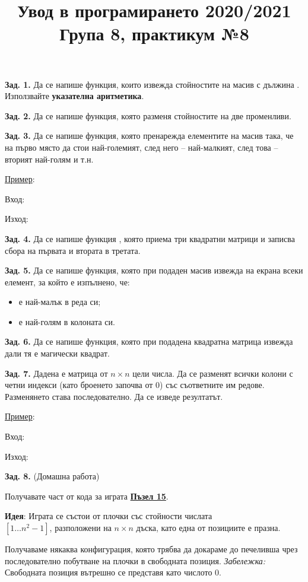 \documentclass[12pt]{article}
\title{Увод в програмирането 2020/2021\\ Група 8, практикум №8}
\date{}
\newcommand{\example}[2] {

    \smallskip
    \underline{Пример}:

    Вход:\hphantom{д} \code{#1}

    Изход: \code{#2}
}
\newcommand{\outputline}[1] {\\\indent \indent #1}
\newcommand{\exercise}[2] {
    \textbf{Зад. #1.} #2
}
\newcommand{\code}[1]{\ltexttt{#1}}
\begin{document}
\maketitle

\exercise{1}{Да се напише функция, които извежда стойностите на масив с дължина \code{n}.
Използвайте \textbf{указателна аритметика}.}
\bigskip

\exercise{2}{Да се напише функция, която разменя стойностите на две променливи.}
\bigskip

\exercise{3}{Да се напише функция, която пренарежда елементите на масив така, че на първо място
да стои най-големият, след него – най-малкият, след това – вторият най-голям и т.н.}
\example{[5, 2, 1, 6, 7, 4]}{[7, 1, 6, 2, 5, 4]}
\bigskip

\exercise{4}{Да се напише функция \code{add}, която приема три квадратни матрици и записва
сбора на първата и втората в третата.}
\bigskip

\exercise{5}{Да се напише функция, която при подаден масив извежда на екрана всеки елемент,
за който е изпълнено, че:
    \begin{itemize}
        \item е най-малък в реда си;
        \item е най-голям в колоната си.
    \end{itemize}
}
\bigskip

\exercise{6}{Да се напише функция, която при подадена квадратна матрица извежда дали
тя е магически квадрат.
}
\bigskip

\newpage

\exercise{7}{Дадена е матрица от $n \times n$ цели числа.
Да се разменят всички колони с четни индекси (като броенето започва от 0) със съответните им редове.
Разменянето става последователно. Да се изведе резултатът.
}
\example{
    \outputline{1 2 3}
    \outputline{4 5 6}
    \outputline{7 8 9}
}{
    \outputline{1 4 3}
    \outputline{2 5 8}
    \outputline{7 6 9}
}
\bigskip

\exercise{8}{(Домашна работа)

Получавате част от кода за играта \href{https://en.wikipedia.org/wiki/15_puzzle}{\textbf{Пъзел 15}}.}

\textbf{Идея}: Играта се състои от плочки със стойности числата\\
$[1 \ldots n^2 - 1]$, разположени на $n \times n$ дъска, като една от позициите е празна.

Получаваме някаква конфигурация, която трябва да докараме до печеливша чрез последователно
побутване на плочки в свободната позиция.
\textit{Забележка:} Свободната позиция вътрешно се представя като числото 0.
\end{document}
